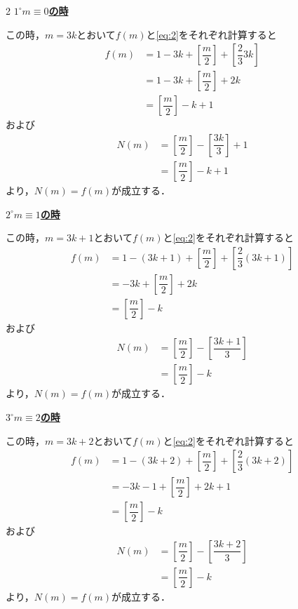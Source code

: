 \documentclass[../../main.tex]{subfiles}
\begin{document}
\begin{multicols}{2}
  \underline{\textbf{$1^{\circ} m \equiv 0$の時}}

  この時，$m=3k$とおいて$f(m)$と\cref{eq:2}をそれぞれ計算すると
  \begin{align}
    f(m)
    & = 1-3k+\left[\dfrac{m}{2}\right]+\left[\dfrac{2}{3}3k\right] \\
    & = 1-3k+\left[\dfrac{m}{2}\right] + 2k                       \\
    & = \left[\dfrac{m}{2}\right] - k +1
  \end{align}
  および
  \begin{align}
    N(m)
    & = \left[\dfrac{m}{2}\right] - \left[\dfrac{3k}{3}\right] + 1 \\
    & = \left[\dfrac{m}{2}\right] - k + 1
  \end{align}
  より，$N(m)=f(m)$が成立する．

  \underline{\textbf{$2^{\circ} m \equiv 1$の時}}

  この時，$m=3k+1$とおいて$f(m)$と\cref{eq:2}をそれぞれ計算すると
  \begin{align}
    f(m)
    & = 1-(3k+1)+\left[\dfrac{m}{2}\right]+\left[\dfrac{2}{3}(3k+1)\right] \\
    & = -3k+\left[\dfrac{m}{2}\right] + 2k                                \\
    & = \left[\dfrac{m}{2}\right] - k
  \end{align}
  および
  \begin{align}
    N(m)
    & = \left[\dfrac{m}{2}\right] - \left[\dfrac{3k+1}{3}\right] \\
    & = \left[\dfrac{m}{2}\right] - k
  \end{align}
  より，$N(m)=f(m)$が成立する．

  \underline{\textbf{$3^{\circ} m \equiv 2$の時}}

  この時，$m=3k+2$とおいて$f(m)$と\cref{eq:2}をそれぞれ計算すると
  \begin{align}
    f(m)
    & = 1-(3k+2)+\left[\dfrac{m}{2}\right]+\left[\dfrac{2}{3}(3k+2)\right] \\
    & = -3k-1+\left[\dfrac{m}{2}\right] + 2k+1                            \\
    & = \left[\dfrac{m}{2}\right] - k
  \end{align}
  および
  \begin{align}
    N(m)
    & = \left[\dfrac{m}{2}\right] - \left[\dfrac{3k+2}{3}\right] \\
    & = \left[\dfrac{m}{2}\right] - k
  \end{align}
  より，$N(m)=f(m)$が成立する．


\end{multicols}
\end{document}
